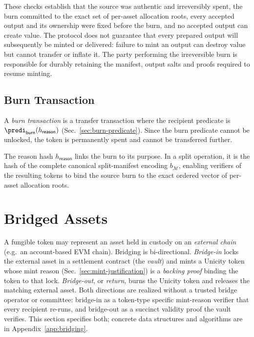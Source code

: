 These checks establish that the source was authentic and irreversibly spent, the burn committed to the exact set of per-asset allocation roots, every accepted output and its ownership were fixed before the burn, and no accepted output can create value.  The protocol does not guarantee that every prepared output will subsequently be minted or delivered: failure to mint an output can destroy value but cannot transfer or inflate it.  The party performing the irreversible burn is responsible for durably retaining the manifest, output salts and proofs required to resume minting.

\subsection{Burn Transaction}\label{sec:burn-transaction}

A \emph{burn transaction} is a transfer transaction where the recipient predicate is $\predi_\mathsf{burn}(h_\mathsf{reason})$ (Sec.~\ref{sec:burn-predicate}). Since the burn predicate cannot be unlocked, the token is permanently spent and cannot be transferred further.

The reason hash $h_\mathsf{reason}$ links the burn to its purpose. In a split operation, it is the hash of the complete canonical split-manifest encoding $b_\mathcal{M}$, enabling verifiers of the resulting tokens to bind the source burn to the exact ordered vector of per-asset allocation roots.


\section{Bridged Assets}\label{sec:bridged-assets}

A fungible token may represent an asset held in custody on an \emph{external chain} (e.g.\ an account-based EVM chain). Bridging is bi-directional. \emph{Bridge-in} locks the external asset in a settlement contract (the \emph{vault}) and mints a Unicity token whose mint reason (Sec.~\ref{sec:mint-justification}) is a \emph{backing proof} binding the token to that lock. \emph{Bridge-out}, or \emph{return}, burns the Unicity token and releases the matching external asset. Both directions are realized without a trusted bridge operator or committee: bridge-in as a token-type specific mint-reason verifier that every recipient re-runs, and bridge-out as a succinct validity proof the vault verifies. This section specifies both; concrete data structures and algorithms are in Appendix~\ref{app:bridging}.

